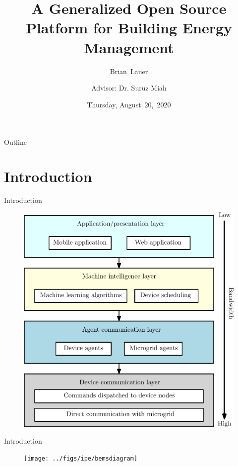 \documentclass{beamer}
\title[Progress Update]{A Generalized Open Source Platform for Building Energy Management}
\author[B.~Lauer]{Brian~Lauer\\\and
Advisor: Dr. Suruz Miah}
\institute[Bradley University] %
{
  Department of Electrical and Computer Engineering\\
  Bradley University\\
  1501 W. Bradley Avenue\\
  Peoria, IL, 61625, USA
}
\date[August~20,~2020]{Thursday, August~20,~2020}
\begin{document}
\begin{frame}
  \titlepage
\end{frame}

\begin{frame}{Outline}
  \tableofcontents
\end{frame}
\section{Introduction}

\begin{frame}{Introduction}{}
  \begin{figure}
  \includegraphics[scale=0.35]{../figs/ipe/BEMS-softwareArchitecture}
  \end{figure}
\end{frame}

\begin{frame}{Introduction}{}
  \begin{figure}
  \texttt{[image: ../figs/ipe/bemsdiagram]}
  \end{figure}
\end{frame}
\end{document}
